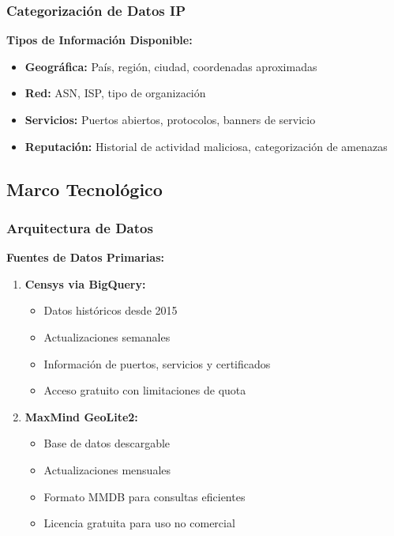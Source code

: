 \subsubsection{Categorización de Datos IP}

\textbf{Tipos de Información Disponible:}
\begin{itemize}
    \item \textbf{Geográfica:} País, región, ciudad, coordenadas aproximadas
    \item \textbf{Red:} ASN, ISP, tipo de organización
    \item \textbf{Servicios:} Puertos abiertos, protocolos, banners de servicio
    \item \textbf{Reputación:} Historial de actividad maliciosa, categorización de amenazas
\end{itemize}

\subsection{Marco Tecnológico}

\subsubsection{Arquitectura de Datos}

\textbf{Fuentes de Datos Primarias:}
\begin{enumerate}
    \item \textbf{Censys via BigQuery:}
    \begin{itemize}
        \item Datos históricos desde 2015
        \item Actualizaciones semanales
        \item Información de puertos, servicios y certificados
        \item Acceso gratuito con limitaciones de quota
    \end{itemize}
    
    \item \textbf{MaxMind GeoLite2:}
    \begin{itemize}
        \item Base de datos descargable
        \item Actualizaciones mensuales
        \item Formato MMDB para consultas eficientes
        \item Licencia gratuita para uso no comercial
    \end{itemize}
\end{enumerate}


